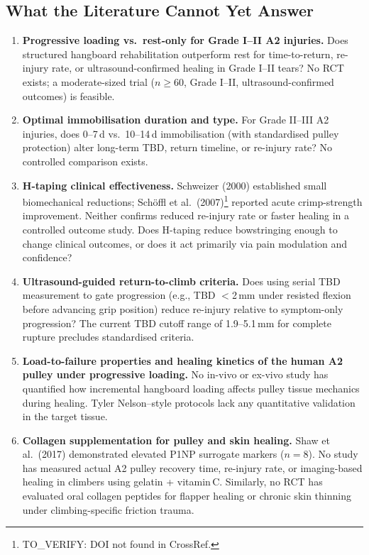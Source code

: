 \subsection{What the Literature Cannot Yet Answer}
\label{subsec:injury-gaps}

\begin{enumerate}[leftmargin=2em]
  \item \textbf{Progressive loading vs.\ rest-only for Grade I--II A2 injuries.} Does structured hangboard rehabilitation outperform rest for time-to-return, re-injury rate, or ultrasound-confirmed healing in Grade I--II tears? No RCT exists; a moderate-sized trial ($n \geq 60$, Grade I--II, ultrasound-confirmed outcomes) is feasible.

  \item \textbf{Optimal immobilisation duration and type.} For Grade II--III A2 injuries, does 0--7\,d vs.\ 10--14\,d immobilisation (with standardised pulley protection) alter long-term TBD, return timeline, or re-injury rate? No controlled comparison exists.

  \item \textbf{H-taping clinical effectiveness.} Schweizer (2000) established small biomechanical reductions; Sch\"{o}ffl et al.\ (2007)\footnote{TO\_VERIFY: DOI not found in CrossRef.} reported acute crimp-strength improvement. Neither confirms reduced re-injury rate or faster healing in a controlled outcome study. Does H-taping reduce bowstringing enough to change clinical outcomes, or does it act primarily via pain modulation and confidence?

  \item \textbf{Ultrasound-guided return-to-climb criteria.} Does using serial TBD measurement to gate progression (e.g., TBD $<$2\,mm under resisted flexion before advancing grip position) reduce re-injury relative to symptom-only progression? The current TBD cutoff range of 1.9--5.1\,mm for complete rupture precludes standardised criteria.

  \item \textbf{Load-to-failure properties and healing kinetics of the human A2 pulley under progressive loading.} No in-vivo or ex-vivo study has quantified how incremental hangboard loading affects pulley tissue mechanics during healing. Tyler Nelson--style protocols lack any quantitative validation in the target tissue.

  \item \textbf{Collagen supplementation for pulley and skin healing.} Shaw et al.\ (2017) demonstrated elevated P1NP surrogate markers ($n=8$). No study has measured actual A2 pulley recovery time, re-injury rate, or imaging-based healing in climbers using gelatin + vitamin\,C. Similarly, no RCT has evaluated oral collagen peptides for flapper healing or chronic skin thinning under climbing-specific friction trauma.


\end{enumerate}
